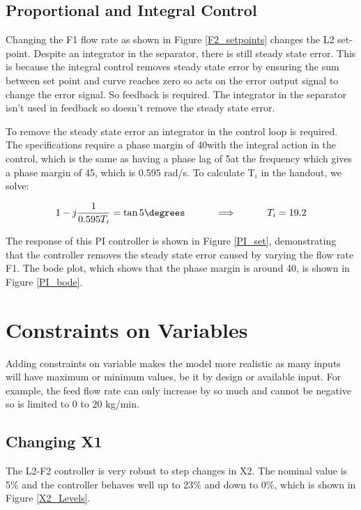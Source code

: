 \documentclass[11pt]{article}
\begin{document}
\subsection{Proportional and Integral Control}
Changing the F1 flow rate as shown in Figure \ref{F2_setpoints} changes the L2 set-point. Despite an integrator in the separator, there is still steady state error. This is because the integral control removes steady state error by ensuring the sum between set point and curve reaches zero so acts on the error output signal to change the error signal. So feedback is required. The integrator in the separator isn't used in feedback so doesn't remove the steady state error. 

To remove the steady state error an integrator in the control loop is required. The specifications require a phase margin of 40\degree with the integral action in the control, which is the same as having a phase lag of 5\degree at the frequency which gives a phase margin of 45\degree, which is 0.595 rad/s. To calculate T$_i$ in the handout, we solve:

\begin{gather*}
1 - j\frac{1}{0.595T_i} = \tan5\degrees \hspace{1cm} \implies \hspace{1cm} T_i = 19.2
\end{gather*}

The response of this PI controller is shown in Figure \ref{PI_set}, demonstrating that the controller removes the steady state error caused by varying the flow rate F1. The bode plot, which shows that the phase margin is around 40\degree, is shown in Figure \ref{PI_bode}.

\section{Constraints on Variables}
Adding constraints on variable makes the model more realistic as many inputs will have maximum or minimum values, be it by design or available input. For example, the feed flow rate can only increase by so much and cannot be negative so is limited to 0 to 20 kg/min.

\subsection{Changing X1}
The L2-F2 controller is very robust to step changes in X2. The nominal value is 5\% and the controller behaves well up to 23\% and down to 0\%, which is shown in Figure \ref{X2_Levels}.
\end{document}
